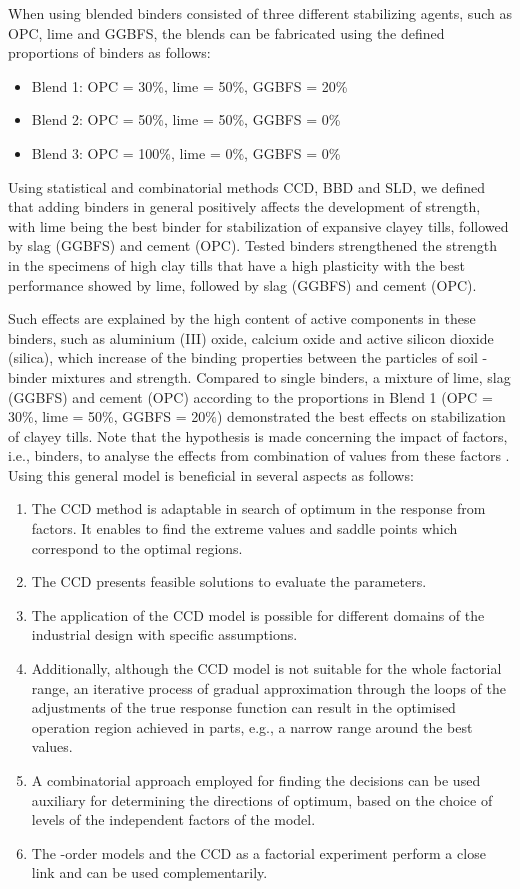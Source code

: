 \documentclass[eprint,
]{actapoly}
\begin{document}
When using blended binders consisted of three different stabilizing agents, such as OPC, lime and GGBFS, the blends can be fabricated using the defined proportions of binders as follows:

\begin{itemize}
	\item [--] Blend 1: OPC = 30\%, lime = 50\%, GGBFS = 20\%
	\item [--] Blend 2: OPC = 50\%, lime = 50\%, GGBFS = 0\%
	\item [--] Blend 3: OPC = 100\%, lime = 0\%, GGBFS = 0\%
\end{itemize}

Using statistical and combinatorial methods CCD, BBD and SLD, we defined that adding binders in general positively affects the development of strength, with lime being the best binder for stabilization of expansive clayey tills, followed by slag (GGBFS) and cement (OPC). Tested binders strengthened the strength in the specimens of high clay tills that have a high plasticity with the best performance showed by lime, followed by slag (GGBFS) and cement (OPC). 

Such effects are explained by the high content of active components in these binders, such as aluminium (III) oxide, calcium oxide and active silicon dioxide (silica), which increase of the binding properties between the particles of soil -binder mixtures and strength. Compared to single binders, a mixture of lime, slag (GGBFS) and cement (OPC) according to the proportions in Blend 1 (OPC = 30\%, lime = 50\%, GGBFS = 20\%) demonstrated the best effects on stabilization of clayey tills. Note that the hypothesis is made concerning the impact of factors, i.e., binders, to analyse the effects from combination of values from these factors \cite{StatSoft}. Using this general model is beneficial in several aspects as follows:

\begin{enumerate}
	\item The CCD method is adaptable in search of optimum in the response from factors. It enables to find the extreme values and saddle points which correspond to the optimal regions.
	\item The CCD presents feasible solutions to evaluate the parameters.
	\item The application of the CCD model is possible for different domains of the industrial design with specific assumptions.
	\item Additionally, although the CCD model is not suitable for the whole factorial range, an iterative process of gradual approximation through the loops of the adjustments of the true response function can result in the optimised operation region achieved in parts, e.g., a narrow range around the best values.
	\item A combinatorial approach employed for finding the decisions can be used auxiliary for determining the directions of optimum, based on the choice of levels of the independent factors of the model.
	\item The -order models and the CCD as a factorial experiment perform a close link and can be used complementarily. 
\end{enumerate}
\end{document}
